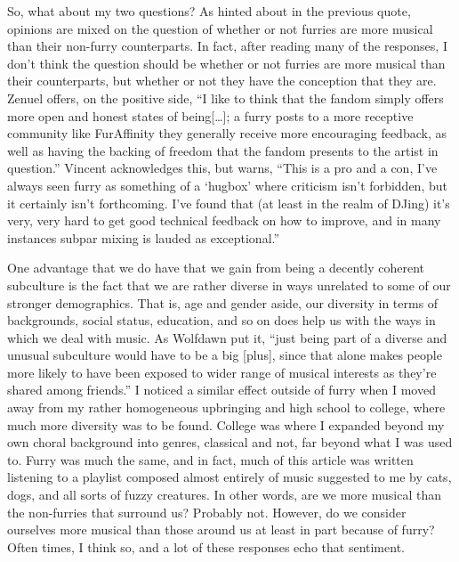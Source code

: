 So, what about my two questions? As hinted about in the previous quote, opinions are mixed on the question of whether or not furries are more musical than their non-furry counterparts. In fact, after reading many of the responses, I don't think the question should be whether or not furries are more musical than their counterparts, but whether or not they have the conception that they are. Zenuel offers, on the positive side, ``I like to think that the fandom simply offers more open and honest states of being[\ldots ]; a furry posts to a more receptive community like FurAffinity they generally receive more encouraging feedback, as well as having the backing of freedom that the fandom presents to the artist in question.'' Vincent acknowledges this, but warns, ``This is a pro and a con, I've always seen furry as something of a `hugbox' where criticism isn't forbidden, but it certainly isn't forthcoming. I've found that (at least in the realm of DJing) it's very, very hard to get good technical feedback on how to improve, and in many instances subpar mixing is lauded as exceptional.''

One advantage that we do have that we gain from being a decently coherent subculture is the fact that we are rather diverse in ways unrelated to some of our stronger demographics. That is, age and gender aside, our diversity in terms of backgrounds, social status, education, and so on does help us with the ways in which we deal with music. As Wolfdawn put it, ``just being part of a diverse and unusual subculture would have to be a big [plus], since that alone makes people more likely to have been exposed to wider range of musical interests as they're shared among friends.'' I noticed a similar effect outside of furry when I moved away from my rather homogeneous upbringing and high school to college, where much more diversity was to be found. College was where I expanded beyond my own choral background into genres, classical and not, far beyond what I was used to. Furry was much the same, and in fact, much of this article was written listening to a playlist composed almost entirely of music suggested to me by cats, dogs, and all sorts of fuzzy creatures. In other words, are we more musical than the non-furries that surround us? Probably not. However, do we consider ourselves more musical than those around us at least in part because of furry? Often times, I think so, and a lot of these responses echo that sentiment.

